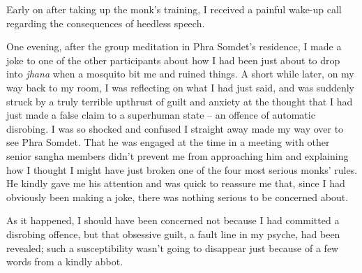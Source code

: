Early on after taking up the monk's training, I received a painful
wake-up call regarding the consequences of heedless speech.

One evening, after the group meditation in Phra Somdet's residence, I
made a joke to one of the other participants about how I had been just
about to drop into \emph{jhana} when a mosquito bit me and ruined
things. A short while later, on my way back to my room, I was reflecting
on what I had just said, and was suddenly struck by a truly terrible
upthrust of guilt and anxiety at the thought that I had just made a
false claim to a superhuman state -- an offence of automatic disrobing.
I was so shocked and confused I straight away made my way over to see
Phra Somdet. That he was engaged at the time in a meeting with other
senior sangha members didn't prevent me from approaching him and
explaining how I thought I might have just broken one of the four most
serious monks' rules. He kindly gave me his attention and was quick to
reassure me that, since I had obviously been making a joke, there was
nothing serious to be concerned about.

As it happened, I should have been concerned not because I had committed
a disrobing offence, but that obsessive guilt, a fault line in my
psyche, had been revealed; such a susceptibility wasn't going to
disappear just because of a few words from a kindly abbot.

